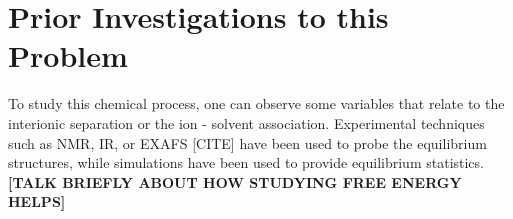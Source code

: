 \section{Prior Investigations to this Problem}

\begin{spacing}{2.0}

    To study this chemical process, one can observe some variables that relate to the interionic separation or the ion - solvent association.
    Experimental techniques such as NMR, IR, or EXAFS [CITE] have been used to probe the equilibrium structures, while simulations have
    been used to provide equilibrium statistics. \textbf{[TALK BRIEFLY ABOUT HOW STUDYING FREE ENERGY HELPS]}

\end{spacing}
